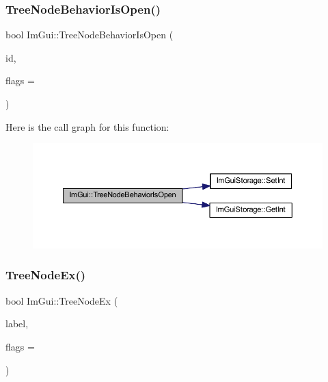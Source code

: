 \subsubsection{\texorpdfstring{Tree\+Node\+Behavior\+Is\+Open()}{TreeNodeBehaviorIsOpen()}}
{\footnotesize\ttfamily bool Im\+Gui\+::\+Tree\+Node\+Behavior\+Is\+Open (\begin{DoxyParamCaption}\item[{\mbox{\hyperlink{imgui_8h_a1785c9b6f4e16406764a85f32582236f}{Im\+Gui\+ID}}}]{id,  }\item[{\mbox{\hyperlink{imgui_8h_a0588fdd10c59b49a0159484fe9ec4564}{Im\+Gui\+Tree\+Node\+Flags}}}]{flags = {} }\end{DoxyParamCaption})}

Here is the call graph for this function\+:
\nopagebreak
\begin{figure}[H]
\begin{center}
\leavevmode
\includegraphics[width=350pt]{namespace_im_gui_a22cc50485aad6da8a3a4e156b500ed4a_cgraph}
\end{center}
\end{figure}
\mbox{\label{namespace_im_gui_a21f62e092dac9556a15a8edee2f70522}} 
\subsubsection{\texorpdfstring{Tree\+Node\+Ex()}{TreeNodeEx()}\hspace{0.1cm}{\footnotesize\ttfamily [1/3]}}
{\footnotesize\ttfamily bool Im\+Gui\+::\+Tree\+Node\+Ex (\begin{DoxyParamCaption}\item[{const char $\ast$}]{label,  }\item[{\mbox{\hyperlink{imgui_8h_a0588fdd10c59b49a0159484fe9ec4564}{Im\+Gui\+Tree\+Node\+Flags}}}]{flags = {} }\end{DoxyParamCaption})}

